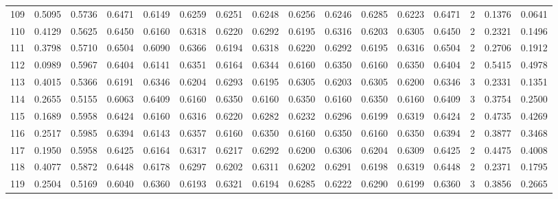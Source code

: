 \begin{tabular}{lrrrrrrrrrrrrrrr}
109 &      0.5095 &  0.5736 &  0.6471 &  0.6149 &  0.6259 &  0.6251 &  0.6248 &  0.6256 &  0.6246 &  0.6285 &   0.6223 &     0.6471 &      2 &                    0.1376 &                     0.0641 \\
110 &      0.4129 &  0.5625 &  0.6450 &  0.6160 &  0.6318 &  0.6220 &  0.6292 &  0.6195 &  0.6316 &  0.6203 &   0.6305 &     0.6450 &      2 &                    0.2321 &                     0.1496 \\
111 &      0.3798 &  0.5710 &  0.6504 &  0.6090 &  0.6366 &  0.6194 &  0.6318 &  0.6220 &  0.6292 &  0.6195 &   0.6316 &     0.6504 &      2 &                    0.2706 &                     0.1912 \\
112 &      0.0989 &  0.5967 &  0.6404 &  0.6141 &  0.6351 &  0.6164 &  0.6344 &  0.6160 &  0.6350 &  0.6160 &   0.6350 &     0.6404 &      2 &                    0.5415 &                     0.4978 \\
113 &      0.4015 &  0.5366 &  0.6191 &  0.6346 &  0.6204 &  0.6293 &  0.6195 &  0.6305 &  0.6203 &  0.6305 &   0.6200 &     0.6346 &      3 &                    0.2331 &                     0.1351 \\
114 &      0.2655 &  0.5155 &  0.6063 &  0.6409 &  0.6160 &  0.6350 &  0.6160 &  0.6350 &  0.6160 &  0.6350 &   0.6160 &     0.6409 &      3 &                    0.3754 &                     0.2500 \\
115 &      0.1689 &  0.5958 &  0.6424 &  0.6160 &  0.6316 &  0.6220 &  0.6282 &  0.6232 &  0.6296 &  0.6199 &   0.6319 &     0.6424 &      2 &                    0.4735 &                     0.4269 \\
116 &      0.2517 &  0.5985 &  0.6394 &  0.6143 &  0.6357 &  0.6160 &  0.6350 &  0.6160 &  0.6350 &  0.6160 &   0.6350 &     0.6394 &      2 &                    0.3877 &                     0.3468 \\
117 &      0.1950 &  0.5958 &  0.6425 &  0.6164 &  0.6317 &  0.6217 &  0.6292 &  0.6200 &  0.6306 &  0.6204 &   0.6309 &     0.6425 &      2 &                    0.4475 &                     0.4008 \\
118 &      0.4077 &  0.5872 &  0.6448 &  0.6178 &  0.6297 &  0.6202 &  0.6311 &  0.6202 &  0.6291 &  0.6198 &   0.6319 &     0.6448 &      2 &                    0.2371 &                     0.1795 \\
119 &      0.2504 &  0.5169 &  0.6040 &  0.6360 &  0.6193 &  0.6321 &  0.6194 &  0.6285 &  0.6222 &  0.6290 &   0.6199 &     0.6360 &      3 &                    0.3856 &                     0.2665 \\

\end{tabular}
